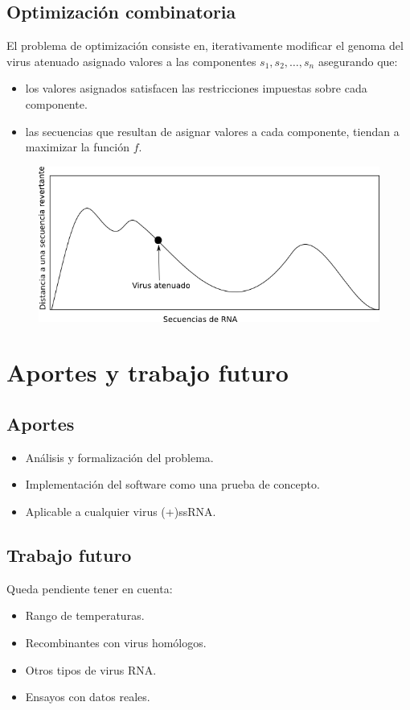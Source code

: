 \documentclass{beamer}
\begin{document}
\subsection{Optimizaci\'on combinatoria}
\begin{frame}
El problema de optimizaci\'on consiste en, iterativamente modificar el genoma
del virus atenuado asignado valores a las componentes $s_{1},s_{2}, \dots,
s_{n}$ asegurando que:
  \begin{itemize}
   \item los valores asignados satisfacen las restricciones impuestas sobre cada
componente.
   \item las secuencias que resultan de asignar valores a cada componente,
tiendan a maximizar la funci\'on $f$.
  \end{itemize}
 \begin{figure}
  \includegraphics[scale=.5]{hillclimbing.png}
 \end{figure}
\end{frame}


\section{Aportes y trabajo futuro}
\subsection{Aportes}
\begin{frame}
 \begin{itemize}
  \item An\'alisis y formalizaci\'on del problema.
  \item Implementaci\'on del software como una prueba de concepto.
  \item Aplicable a cualquier virus (+)ssRNA.
 \end{itemize}
\end{frame}

\subsection{Trabajo futuro}
\begin{frame}
Queda pendiente tener en cuenta:
  \begin{itemize}
   \item Rango de temperaturas.
   \item Recombinantes con virus hom\'ologos.
   \item Otros tipos de virus RNA.
   \item Ensayos con datos reales.
  \end{itemize}
\end{frame}
\end{document}
